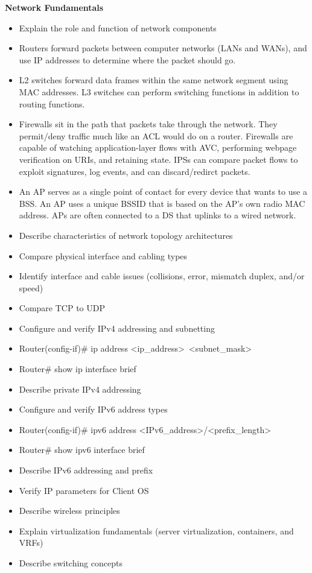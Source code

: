 \documentclass{article}
\begin{document}
\begin{flushleft}\textbf{Network Fundamentals}\end{flushleft}
\begin{itemize}
  \item Explain the role and function of network components
  	\item[] Routers forward packets between computer networks (LANs and WANs), and use IP addresses to determine where the packet should go.
	\item[] L2 switches forward data frames within the same network segment using MAC addresses. L3 switches can perform switching functions in addition to routing functions.
	\item[] Firewalls sit in the path that packets take through the network. They permit/deny traffic much like an ACL would do on a router. Firewalls are capable of watching application-layer flows with AVC, performing webpage verification on URIs, and retaining state. IPSs can compare packet flows to exploit signatures, log events, and can discard/redirct packets.
	\item[] An AP serves as a single point of contact for every device that wants to use a BSS. An AP uses a unique BSSID that is based on the AP's own radio MAC address. APs are often connected to a DS that uplinks to a wired network.
  \item Describe characteristics of network topology architectures
  \item Compare physical interface and cabling types
  \item Identify interface and cable issues (collisions, error, mismatch duplex, and/or speed)
  \item Compare TCP to UDP
  \item Configure and verify IPv4 addressing and subnetting
  	\item[] Router(config-if)\# ip address \textless ip\_address\textgreater\ \textless subnet\_mask\textgreater
  	\item[] Router\# show ip interface brief\\
  \item Describe private IPv4 addressing
  \item Configure and verify IPv6 address types
  	\item[] Router(config-if)\# ipv6 address \textless IPv6\_address\textgreater/\textless prefix\_length\textgreater
  	\item[] Router\# show ipv6 interface brief\\
  \item Describe IPv6 addressing and prefix
  \item Verify IP parameters for Client OS
  \item Describe wireless principles
  \item Explain virtualization fundamentals (server virtualization, containers, and VRFs)
  \item Describe switching concepts\\
\end{itemize}
\end{document}
